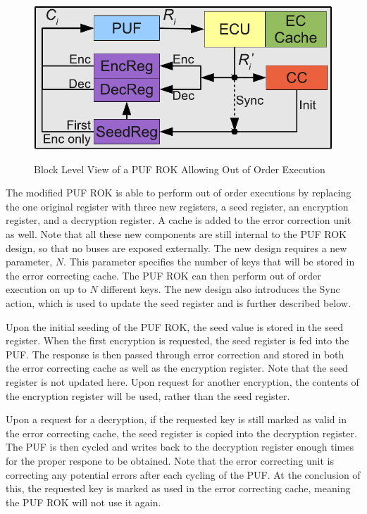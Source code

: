 \begin{figure}[!ht]
\includegraphics[width=500px]{images/rok_socreg.pdf}
\label{fig:rok}
\caption{Block Level View of a PUF ROK Allowing Out of Order Execution}
\end{figure}
\FloatBarrier

The modified PUF ROK is able to perform out of order executions by replacing the one original register with three
new registers, a seed register, an encryption register, and a decryption register. A cache is added to the error
correction unit as well. Note that all these new components are still internal to the PUF ROK design, so that no
buses are exposed externally.
The new design requires a new parameter, $N$. This parameter specifies the number of keys that will be stored in
the error correcting cache. The PUF ROK can then perform out of order execution on up to $N$ different keys.
The new design also introduces the Sync action, which is used to update the seed register and is further described
below.

Upon the initial seeding of the PUF ROK, the seed value is stored in the seed register. When the first encryption
is requested, the seed register is fed into the PUF. The response is then passed through error correction and stored
in both the error correcting cache as well as the encryption register. Note that the seed register is not updated here.
Upon request for another encryption, the contents of the encryption register will be used, rather than the seed register.

Upon a request for a decryption, if the requested key is still marked as valid in the error correcting cache,
the seed register is copied into the decryption register. The PUF is then cycled
and writes back to the decryption register enough times for the proper respone to be obtained. Note that the
error correcting unit is correcting any potential errors after each cycling of the PUF. At the conclusion of this, the
requested key is marked as used in the error correcting cache, meaning the PUF ROK will not use it again.

